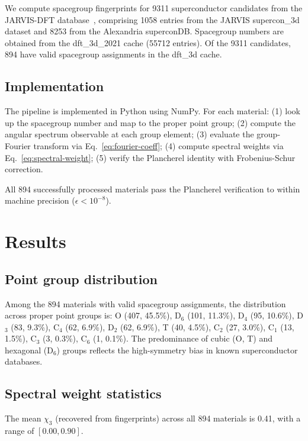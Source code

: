 \documentclass[aps,prb,twocolumn,superscriptaddress]{revtex4-2}
\begin{document}
We compute spacegroup fingerprints for 9311 superconductor candidates
from the JARVIS-DFT database~\cite{choudhary2022jarvis}, comprising
1058 entries from the JARVIS supercon\_3d dataset and 8253 from the
Alexandria superconDB. Spacegroup numbers are obtained from the
dft\_3d\_2021 cache (55712 entries). Of the 9311 candidates, 894
have valid spacegroup assignments in the dft\_3d cache.

\subsection{Implementation}

The pipeline is implemented in Python using NumPy. For each material:
(1) look up the spacegroup number and map to the proper point group;
(2) compute the angular spectrum observable at each group element;
(3) evaluate the group-Fourier transform via Eq.~\eqref{eq:fourier-coeff};
(4) compute spectral weights via Eq.~\eqref{eq:spectral-weight};
(5) verify the Plancherel identity with Frobenius-Schur correction.

All 894 successfully processed materials pass the Plancherel
verification to within machine precision ($\epsilon < 10^{-8}$).

\section{Results}
\label{sec:results}

\subsection{Point group distribution}

Among the 894 materials with valid spacegroup assignments, the
distribution across proper point groups is: O (407, 45.5\%),
D$_6$ (101, 11.3\%), D$_4$ (95, 10.6\%), D$_3$ (83, 9.3\%),
C$_4$ (62, 6.9\%), D$_2$ (62, 6.9\%), T (40, 4.5\%),
C$_2$ (27, 3.0\%), C$_1$ (13, 1.5\%), C$_3$ (3, 0.3\%),
C$_6$ (1, 0.1\%). The predominance of cubic (O, T) and hexagonal
(D$_6$) groups reflects the high-symmetry bias in known
superconductor databases.

\subsection{Spectral weight statistics}

The mean $\chi_3$ (recovered from fingerprints) across all 894
materials is 0.41, with a range of $[0.00, 0.90]$.
\end{document}
